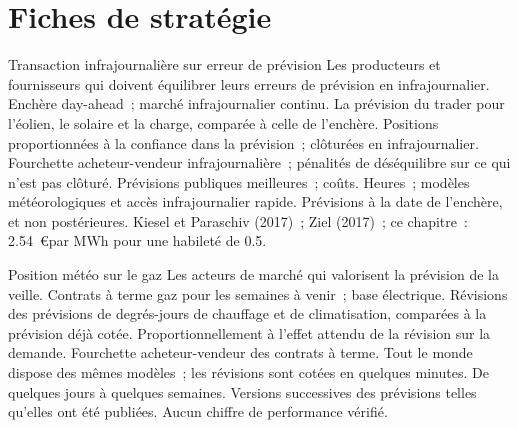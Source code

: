 \section{Fiches de stratégie}

\begin{strategyfile}{Transaction infrajournalière sur erreur de prévision}\label{strat:s2:power-and-gas-trading:forecast}
 Les producteurs et fournisseurs qui doivent équilibrer leurs erreurs de prévision en infrajournalier.
 Enchère day-ahead~; marché infrajournalier continu.
 La prévision du trader pour l'éolien, le solaire et la charge, comparée à celle de l'enchère.
 Positions proportionnées à la confiance dans la prévision~; clôturées en infrajournalier.
 Fourchette acheteur-vendeur infrajournalière~; pénalités de déséquilibre sur ce qui n'est pas clôturé.
 Prévisions publiques meilleures~; coûts.
 Heures~; modèles météorologiques et accès infrajournalier rapide.
 Prévisions à la date de l'enchère, et non postérieures.
 Kiesel et Paraschiv (2017)~; Ziel (2017)~; ce chapitre~: 2.54~\euro par MWh pour une habileté de 0.5.
\end{strategyfile}

\begin{strategyfile}{Position météo sur le gaz}\label{strat:s2:power-and-gas-trading:weather}
 Les acteurs de marché qui valorisent la prévision de la veille.
 Contrats à terme gaz pour les semaines à venir~; base électrique.
 Révisions des prévisions de degrés-jours de chauffage et de climatisation, comparées à la prévision déjà cotée.
 Proportionnellement à l'effet attendu de la révision sur la demande.
 Fourchette acheteur-vendeur des contrats à terme.
 Tout le monde dispose des mêmes modèles~; les révisions sont cotées en quelques minutes.
 De quelques jours à quelques semaines.
 Versions successives des prévisions telles qu'elles ont été publiées.
 Aucun chiffre de performance vérifié.
\end{strategyfile}

